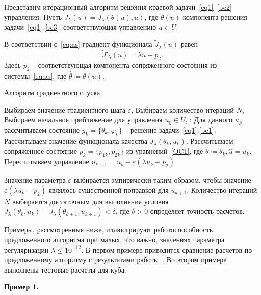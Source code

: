 \documentclass[12pt]{article}
\begin{document}
    Представим итерационный алгоритм решения краевой задачи~\eqref{eq1}--\eqref{bc2} управления.
    Пусть $\tilde J_\lambda(u)=J_\lambda(\theta(u), u)$, где $\theta(u)$ компонента решения
    задачи~\eqref{eq1},\eqref{bc3}, соответствующая управлению $u\in U$.

    В соответствии с~\eqref{eq:as} градиент функционала $\tilde J_\lambda(u)$ равен
    \[
        \tilde J'_\lambda (u) = \lambda u - p_2.
    \]
    Здесь $p_2$ -- соответствующая компонента сопряженного состояния из системы~\eqref{eq:as},
    где $\hat{\theta}\coloneqq\theta(u)$.

    \begin{algorithm}[H]
        \caption{Алгоритм градиентного спуска}
        \label{alg:algorithm}
        \begin{algorithmic}[1]
            \State Выбираем значение градиентного шага $\varepsilon$,
            \State Выбираем количество итераций $N$,
            \State Выбираем начальное приближение для управления $u_0 \in U$,
                :
                \State Для данного $u_k$ рассчитываем состояние $y_k = \{\theta_k, \varphi_k\}$ --
                решение задачи~\eqref{eq1},\eqref{bc1}.
                \State Рассчитываем значение функционала качества $J_\lambda(\theta_k, u_k)$.
                \State Рассчитываем сопряженное состояние $p_k=\{p_{1k},p_{2k}\}$ из уравнений~\eqref{OC1},
                где $ \hat{\theta} \coloneqq \theta_k, \hat{u}=u_k$.
                \State Пересчитываем управление $u_{k+1} = u_k - \varepsilon (\lambda u_k - p_2)$
            \EndFor
        \end{algorithmic}
    \end{algorithm}
    Значение параметра $\varepsilon$ выбирается эмпирически таким образом, чтобы значение
    $\varepsilon (\lambda u_k - p_2)$ являлось существенной поправкой для $u_{k+1}$.
    Количество итераций $N$ выбирается достаточным для выполнения условия
    $J_\lambda(\theta_k, u_k) - J_\lambda(\theta_{k+1}, u_{k+1}) < \delta$, где $\delta>0$ определяет точность расчетов.

    Примеры, рассмотренные ниже, иллюстрируют работоспособность предложенного алгоритма при
    малых, что важно, значениях параметра регуляризации $\lambda \leq 10^{-12}.$
    В первом примере приводится сравнение расчетов по
    предложенному алгоритму с результатами работы~\cite{CNSNS19}.
    Во втором примере выполнены тестовые расчеты для куба.

    \textbf{Пример 1.}
\end{document}
